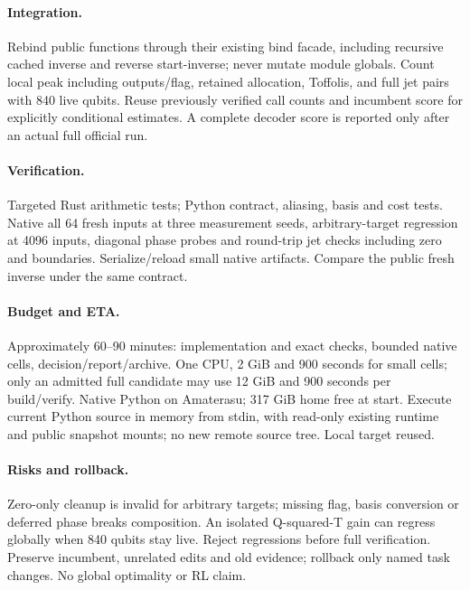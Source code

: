 \documentclass{article}
\begin{document}
\paragraph{Integration.} Rebind public functions through their existing bind
facade, including recursive cached inverse and reverse start-inverse; never mutate
module globals. Count local peak including outputs/flag, retained allocation,
Toffolis, and full jet pairs with 840 live qubits. Reuse previously verified call
counts and incumbent score for explicitly conditional estimates. A complete
decoder score is reported only after an actual full official run.
\paragraph{Verification.} Targeted Rust arithmetic tests; Python contract,
aliasing, basis and cost tests. Native all 64 fresh inputs at three measurement
seeds, arbitrary-target regression at 4096 inputs, diagonal phase probes and
round-trip jet checks including zero and boundaries. Serialize/reload small native
artifacts. Compare the public fresh inverse under the same contract.
\paragraph{Budget and ETA.} Approximately 60--90 minutes: implementation and
exact checks, bounded native cells, decision/report/archive. One CPU, 2 GiB and
900 seconds for small cells; only an admitted full candidate may use 12 GiB and
900 seconds per build/verify. Native Python on Amaterasu; 317 GiB home free at
start. Execute current Python source in memory from stdin, with read-only existing
runtime and public snapshot mounts; no new remote source tree. Local target reused.
\paragraph{Risks and rollback.} Zero-only cleanup is invalid for arbitrary
targets; missing flag, basis conversion or deferred phase breaks composition.
An isolated Q-squared-T gain can regress globally when 840 qubits stay live.
Reject regressions before full verification. Preserve incumbent, unrelated edits
and old evidence; rollback only named task changes. No global optimality or RL claim.
\begin{center}\end{center}
\end{document}
